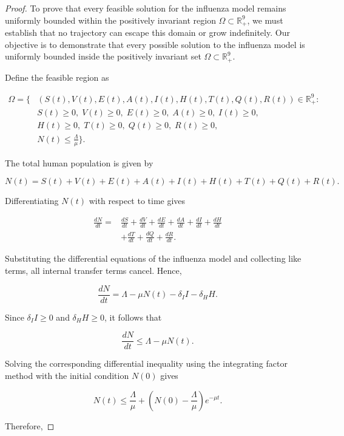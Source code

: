 \documentclass[12pt,a4paper]{article}
\theoremstyle{definition}
\theoremstyle{remark}
\begin{document}
\begin{proof}

To prove that every feasible solution for the influenza model remains uniformly bounded within the positively invariant region $\Omega\subset\mathbb{R}_{+}^{9}$, we must establish that no trajectory can escape this domain or grow indefinitely. Our objective is to demonstrate that every possible solution to the influenza model is uniformly bounded inside the positively invariant set $\Omega\subset\mathbb{R}_{+}^{9}$.



Define the feasible region as

\[
\begin{aligned}
\Omega=\{ &(S(t),V(t),E(t),A(t),I(t),H(t),T(t),Q(t),R(t))
\in\mathbb{R}_{+}^{9}:\\
&S(t)\geq0,\;V(t)\geq0,\;E(t)\geq0,\;A(t)\geq0,\;I(t)\geq0,\\
&H(t)\geq0,\;T(t)\geq0,\;Q(t)\geq0,\;R(t)\geq0,\\
&N(t)\leq \frac{\Lambda}{\mu}\}.
\end{aligned}
\]

The total human population is given by

\[
N(t)=S(t)+V(t)+E(t)+A(t)+I(t)+H(t)+T(t)+Q(t)+R(t).
\]

Differentiating $N(t)$ with respect to time gives

\[
\begin{aligned}
\frac{dN}{dt}
={}&\frac{dS}{dt}+\frac{dV}{dt}+\frac{dE}{dt}
+\frac{dA}{dt}+\frac{dI}{dt}+\frac{dH}{dt}\\
&+\frac{dT}{dt}+\frac{dQ}{dt}+\frac{dR}{dt}.
\end{aligned}
\]

Substituting the differential equations of the influenza model and
collecting like terms, all internal transfer terms cancel. Hence,

\[
\frac{dN}{dt}
=
\Lambda-\mu N(t)-\delta_I I-\delta_H H.
\]

Since $\delta_I I\geq0$ and $\delta_H H\geq0$, it follows that

\[
\frac{dN}{dt}\leq\Lambda-\mu N(t).
\]

Solving the corresponding differential inequality using the integrating
factor method with the initial condition $N(0)$ gives

\[
N(t)
\leq
\frac{\Lambda}{\mu}
+
\left(
N(0)-\frac{\Lambda}{\mu}
\right)e^{-\mu t}.
\]

Therefore,


\end{proof}
\end{document}
